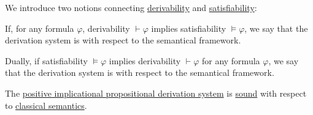 \begin{definition}\label{def:derivability_and_satisfiability}
  We introduce two notions connecting \hyperref[def:first_order_derivability/derivability]{derivability} and \hyperref[def:first_order_semantics/satisfiability]{satisfiability}:
  \begin{thmenum}
     If, for any formula \( \varphi \), derivability \( \vdash \varphi \) implies satisfiability \( \vDash \varphi \), we say that the derivation system is  with respect to the semantical framework.

     Dually, if satisfiability \( \vDash \varphi \) implies derivability \( \vdash \varphi \) for any formula \( \varphi \), we say that the derivation system is  with respect to the semantical framework.
  \end{thmenum}
\end{definition}

\begin{proposition}\label{thm:soundness_of_hilberts_derivation_system}
  The \hyperref[def:positive_implicational_propositional_derivation_system]{positive implicational propositional derivation system} is \hyperref[def:derivability_and_satisfiability/soundness]{sound} with respect to \hyperref[def:propositional_semantics]{classical semantics}.
\end{proposition}

